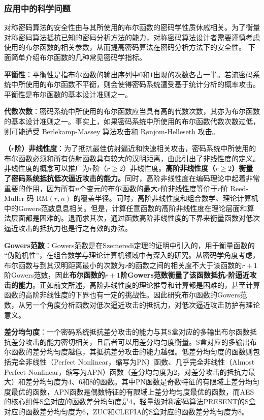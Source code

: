 \documentclass[a4paper,zihao=-4,AutoFakeBold]{ctexart}
\begin{document}
\subsubsection{应用中的科学问题}
对称密码算法的安全性由与其所使用的布尔函数的密码学性质休戚相关。为了衡量对称密码算法抵抗已知的密码分析方法的能力，对称密码算法设计者需要谨慎考虑使用的布尔函数的相关参数，从而提高密码算法在密码分析方法下的安全性。
下面简单介绍布尔函数的几种常见密码学指标。

\textbf{平衡性}：平衡性是指布尔函数的输出序列中$0$和$1$出现的次数各占一半。若流密码系统中所使用的布尔函数不平衡，则会使得密码系统遭受基于统计分析的概率攻击。平衡性是布尔函数的基本设计准则之一。

\textbf{代数次数}：密码系统中所使用的布尔函数应当具有高的代数次数，其亦为布尔函数的基本设计准则之一。事实上，如果密码系统中所使用的布尔函数代数次数过低，则可能遭受 Berlekamp-Massey 算法攻击和 Rønjom-Helleseth 攻击。

\textbf{（$r$阶）非线性度}：为了抵抗最佳仿射逼近和快速相关攻击，密码系统中所使用的布尔函数必须和所有仿射函数具有较大的汉明距离，由此引出了非线性度的定义。非线性度的概念可以推广为$r$阶（$r\ge 2$）非线性度。\textbf{高阶非线性度（$r\ge 2$）衡量了密码系统抵抗低次逼近攻击的能力。}同时，高阶非线性度在编码理论中起着非常重要的作用，因为所有$n$个变元的布尔函数的最大$r$阶非线性度等价于$r$阶 Reed-Muller 码 $\mathrm{RM}(r, n)$ 的覆盖半径。同时，高阶非线性度和组合数学、理论计算机中的Gowers范数息息相关。但是，计算任意函数的高阶非线性度在理论层面和算法层面都是困难的。退而求其次，通过函数高阶非线性度的下界来衡量函数对低次逼近攻击的抵抗力也是行之有效的办法。\label{sec:higher_order_nl}

\textbf{Gowers范数}：Gowers范数是在Szemeredi定理的证明中引入的，用于衡量函数的 ``伪随机性''，在组合数学与理论计算机领域中有深入的研究。从密码学角度考虑，布尔函数与到其汉明距离最小的次数为$r$的函数之间的相关度不大于该函数的$r+1$阶Gowers范数，因此\textbf{布尔函数的$r+1$阶Gowers范数衡量了该函数抵抗$r$阶逼近攻击的能力}。正如前文所述，高阶非线性度的理论推导和计算都是困难的，甚至计算函数的高阶非线性度的下界也有一定的挑战性。因此研究布尔函数的Gowers范数，从另一个角度分析函数对低次逼近攻击的抵抗力，对低次逼近攻击防护有理论意义。

\textbf{差分均匀度}：一个密码系统抵抗差分攻击的能力与其S盒对应的多输出布尔函数抵抗差分攻击的能力密切相关，且后者可以用差分均匀度衡量。S盒对应的多输出布尔函数的差分均匀度越低，其抵抗差分攻击的能力越强。低差分均匀度的函数则包括完全非线性（Perfect Nonlinear，缩写为PN）函数、几乎完全非线性（Almost Perfect Nonlinear，缩写为APN）函数（差分均匀度为2，对差分攻击的抵抗力最大）和差分均匀度为4、6和8的函数。其中PN函数是奇数特征的有限域上差分均匀度最优的函数，APN函数是偶数特征的有限域上差分均匀度最优的函数，而AES的核心组件S盒对应的函数差分均匀度是4，轻量级对称密码算法PRESENT的S盒对应的函数差分均匀度为6，ZUC和CLEFIA的S盒对应的函数差分均匀度为8。
\end{document}

